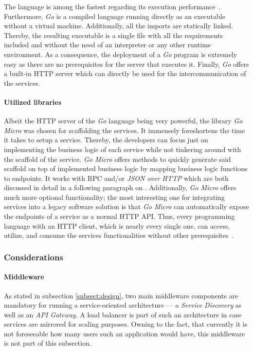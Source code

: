 \documentclass[12pt,a4paper]{report}
\begin{document}
The language is among the fastest regarding its execution performance~\cn.
Furthermore, \textit{Go} is a compiled language running directly as an executable
without a virtual machine. Additionally, all the imports are statically linked.
Thereby, the resulting executable is a single file with all the requirements
included and without the need of an interpreter or any other runtime environment.
As a consequence, the deployment of a \textit{Go} program is extremely easy as
there are no prerequisites for the server that executes it.
Finally, \textit{Go} offers a built-in HTTP server which can directly be used
for the intercommunication of the services.

\paragraph{Utilized libraries}
Albeit the HTTP server of the \textit{Go} language being very powerful,
the library \textit{Go Micro} was chosen for scaffolding the services.
It immensely foreshortens the time it takes to setup a service.
Thereby, the developers can focus just on implementing the business logic
of each service while not tinkering around with the scaffold of the service.
\textit{Go Micro} offers methods to quickly generate said scaffold on top
of implemented business logic by mapping business logic functions to endpoints.
It works with RPC and/or \textit{JSON over HTTP} which are both discussed
in detail in a following paragraph on \textit{}.
Additionally, \textit{Go Micro} offers much more optional functionality;
the most interesting one for integrating services into a legacy software solution
is that \textit{Go Micro} can automatically expose the endpoints of a service
as a normal HTTP API. Thus, every programming language with an HTTP client,
which is nearly every single one, can access, utilize, and consume the services
functionalities without other prerequisites~\cite{go-micro}.


\subsubsection{Considerations}

\paragraph{Middleware}
As stated in subsection \ref{subsect:design}, two main middleware components
are mandatory for running a service-oriented architecture ---
a \textit{Service Discovery} as well as an \textit{API Gateway}.
A load balancer is part of such an architecture in case services are mirrored
for scaling purposes. Owning to the fact, that currently it is not foreseeable
how many users such an application would have, this middleware is not part of
this subsection.
\end{document}
